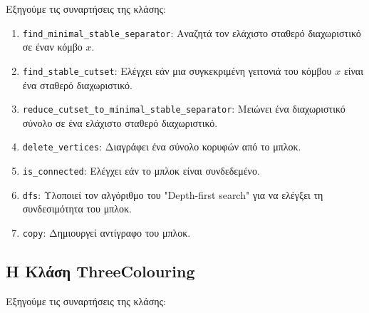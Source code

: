 


Εξηγούμε τις συναρτήσεις της κλάσης:

\begin{enumerate}
	\item \texttt{find\_minimal\_stable\_separator}: Αναζητά τον ελάχιστο σταθερό διαχωριστικό σε έναν κόμβο $x$.
	
	\item \texttt{find\_stable\_cutset}: Ελέγχει εάν μια συγκεκριμένη γειτονιά του κόμβου $x$ είναι ένα σταθερό διαχωριστικό.
	
	\item \texttt{reduce\_cutset\_to\_minimal\_stable\_separator}: Μειώνει ένα διαχωριστικό σύνολο σε ένα ελάχιστο σταθερό διαχωριστικό.
	
	\item \texttt{delete\_vertices}: Διαγράφει ένα σύνολο κορυφών από το μπλοκ.
	
	\item \texttt{is\_connected}: Ελέγχει εάν το μπλοκ είναι συνδεδεμένο.
	
	\item \texttt{dfs}: Υλοποιεί τον αλγόριθμο του "Depth-first search" για να ελέγξει τη συνδεσιμότητα του μπλοκ.
	
	\item \texttt{copy}: Δημιουργεί αντίγραφο του μπλοκ.
\end{enumerate}

\subsection{H Kλάση ThreeColouring}





Εξηγούμε τις συναρτήσεις της κλάσης:


